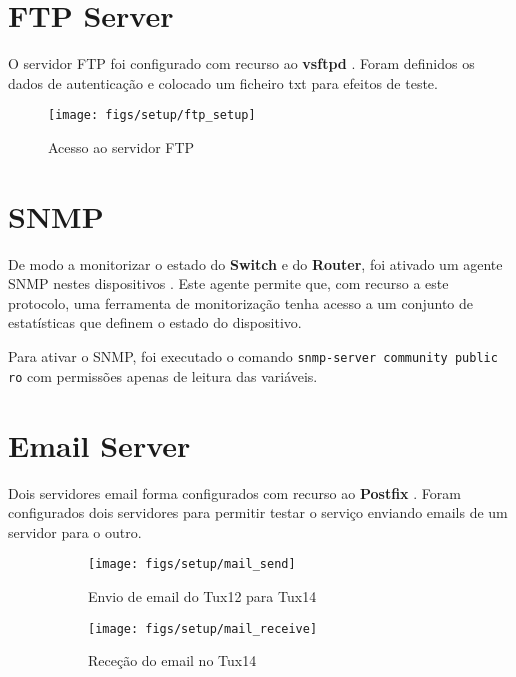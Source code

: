 \pagebreak

\section{FTP Server}

O servidor FTP foi configurado com recurso ao \textbf{vsftpd} \cite{FTP}.
Foram definidos os dados de autenticação e colocado um ficheiro txt para efeitos de teste.

\begin{figure}[H]
    \centering
    \texttt{[image: figs/setup/ftp\_setup]}
    \caption{Acesso ao servidor FTP}
    \label{fig:ftp_setup}
\end{figure}

\section{SNMP}

De modo a monitorizar o estado do \textbf{Switch} e do \textbf{Router}, foi ativado um agente SNMP nestes dispositivos \cite{SNMP}.
Este agente permite que, com recurso a este protocolo, uma ferramenta de monitorização tenha acesso a um conjunto de estatísticas que definem o estado do dispositivo. 

Para ativar o SNMP, foi executado o comando \verb|snmp-server community public ro| com permissões apenas de leitura das variáveis.

\pagebreak

\section{Email Server}
Dois servidores email forma configurados com recurso ao \textbf{Postfix} \cite{Email}.
Foram configurados dois servidores para permitir testar o serviço enviando emails de um servidor para o outro.

\begin{figure}[H]
    \centering
    \begin{subfigure}[b]{0.9\textwidth}
        \centering
        \texttt{[image: figs/setup/mail\_send]}
        \caption{Envio de email do Tux12 para Tux14}
        \label{fig:mail_send}
    \end{subfigure}
    \hfill
    \begin{subfigure}[b]{0.9\textwidth}
        \centering
        \texttt{[image: figs/setup/mail\_receive]}
        \caption{Receção do email no Tux14}
        \label{fig:mail_receive}
    \end{subfigure}
    \caption{}
\end{figure}